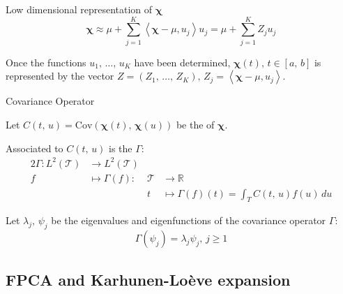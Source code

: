 \begin{definition}{Low dimensional representation of $\boldsymbol \chi$}{}
	\begin{equation*}
		\boldsymbol \chi \approx \mu + \sum_{j=1}^K \left\langle
		\boldsymbol \chi - \mu, u_j
		\right\rangle u_j = \mu + \sum_{j=1}^K Z_j u_j
	\end{equation*}

	Once the functions $u_1,\, \dots,\, u_K$ have been determined, $\boldsymbol \chi(t),\,t\in[a,\,b]$
	is represented by the vector $Z = (Z_1,\, \dots,\, Z_K),\, Z_j = \left\langle
		\boldsymbol \chi - \mu, u_j
		\right\rangle$.
\end{definition}

\begin{definition}{Covariance Operator}{}

	Let $C(t,\,u) = \text{Cov} \left( \boldsymbol \chi(t),\, \boldsymbol \chi(u) \right)$ be
	the  of $\boldsymbol \chi$.

	Associated to $C(t,\,u)$ is the  $\Gamma$:
	\begin{alignat*}{2}
		\Gamma : L^2(\mathcal T) & \to L^2(\mathcal T) &             &                                                   \\
		f                        & \mapsto \Gamma(f) : & \mathcal  T & \to \mathds R                                     \\
		                         &                     & t           & \mapsto \Gamma(f)(t) = \int_T C(t,\,u) f(u) \, du
	\end{alignat*}

	Let $\lambda_j,\,\psi_j$ be the eigenvalues and eigenfunctions of the
	covariance operator $\Gamma$:
	\begin{equation*}
		\Gamma(\psi_j) = \lambda_j \psi_j,\,j \geq 1
	\end{equation*}
\end{definition}

\subsection{FPCA and Karhunen-Loève expansion}

